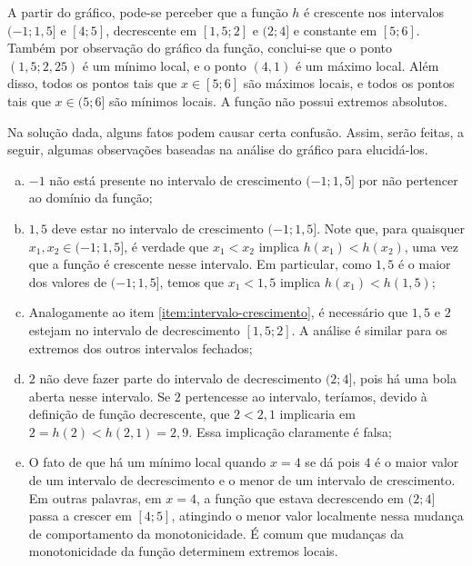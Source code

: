 \begin{solution}
    A partir do gráfico, pode-se perceber que a função $h$ é crescente nos intervalos $(-1;1{,}5]$ e $[4;5]$,
    decrescente em $[1,5; 2]$ e $(2;4]$ e constante em $[5;6]$.     
    Também por observação do gráfico da função, conclui-se que o ponto $(1{,}5; 2{,}25)$ é um mínimo local,
    e o ponto $(4,1)$ é um máximo local. 
    Além disso, todos os pontos tais que $x \in [5;6]$ são máximos locais,
    e todos os pontos tais que $x \in (5; 6]$ são mínimos locais.
    A função não possui extremos absolutos.

    Na solução dada, alguns fatos podem causar certa confusão. 
    Assim, serão feitas, a seguir, algumas observações baseadas na análise do gráfico para elucidá-los.
    \begin{enumerate}[(a)]
        \item $-1$ não está presente no intervalo de crescimento $(-1;1{,}5]$ por não pertencer ao domínio da função;
        \item \label{item:intervalo-crescimento} $1{,}5$ deve estar no intervalo de crescimento $(-1;1{,}5]$. 
        Note que, para quaisquer $x_1, x_2 \in (-1;1{,}5]$, é verdade que $x_1 < x_2$ implica $h(x_1) < h(x_2)$,
        uma vez que a função é crescente nesse intervalo. 
        Em particular, como $1{,}5$ é o maior dos valores de $(-1;1{,}5]$, 
        temos que $x_1 < 1{,}5$ implica $h(x_1) < h(1{,}5)$;
        \item Analogamente ao item \ref{item:intervalo-crescimento},
        é necessário que $1{,}5$ e $2$ estejam no intervalo de decrescimento $[1,5; 2]$.
        A análise é similar para os extremos dos outros intervalos fechados;
        \item $2$ não deve fazer parte do intervalo de decrescimento $(2; 4]$, 
        pois há uma bola aberta nesse intervalo. 
        Se $2$ pertencesse ao intervalo, teríamos, devido à definição de função decrescente,
        que $2<2{,}1$ implicaria em $2 = h(2) < h(2{,}1) = 2{,}9$. 
        Essa implicação claramente é falsa;
        \item \label{item:minimo-local} O fato de que há um mínimo local quando $x = 4$ se dá pois $4$ é o maior valor de um intervalo de decrescimento e o menor de um intervalo de crescimento. 
        Em outras palavras, em $x=4$, a função que estava decrescendo em $(2;4]$ passa a crescer em $[4;5]$,
        atingindo o menor valor localmente nessa mudança de comportamento da monotonicidade. 
        É comum que mudanças da monotonicidade da função determinem extremos locais.

\end{enumerate}
\end{solution}
